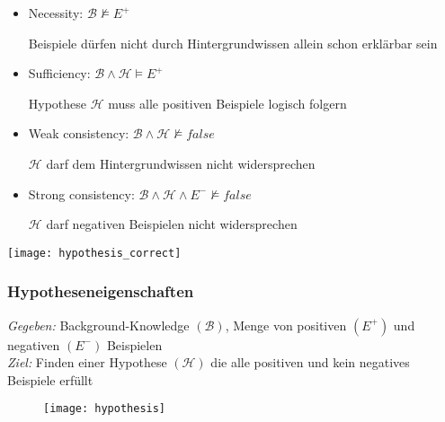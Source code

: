 \begin{frame}
	\begin{minipage}{0.5\textwidth}
	\begin{itemize}
		\item Necessity:          $\mathcal{B} \nvDash E^{+}$

			Beispiele dürfen nicht durch Hintergrundwissen allein schon erklärbar sein

		\item Sufficiency:        $\mathcal{B} \land \mathcal{H} \vDash E^{+}$

			Hypothese $\mathcal{H}$ muss alle positiven Beispiele logisch folgern

		\item Weak consistency:   $\mathcal{B} \land \mathcal{H} \nvDash false$

			$\mathcal{H}$ darf dem Hintergrundwissen nicht widersprechen

		\item Strong consistency: $\mathcal{B} \land \mathcal{H} \land E^{-} \nvDash false$

			$\mathcal{H}$ darf negativen Beispielen nicht widersprechen
	\end{itemize}
	\end{minipage}
	\begin{minipage}{0.45\textwidth}
		\centering
		\texttt{[image: hypothesis\_correct]}
	\end{minipage}
\end{frame}
\begin{frame}
\frametitle{Hypotheseneigenschaften}
	\emph{Gegeben:} Background-Knowledge $(\mathcal{B})$, Menge von positiven $(E^+)$ und negativen $(E^-)$ Beispielen\\
	\emph{Ziel:} Finden einer Hypothese $(\mathcal{H})$ die alle positiven und kein negatives Beispiele erfüllt
\begin{figure}[H]
	\centering
	\texttt{[image: hypothesis]}
\end{figure}
\end{frame}

